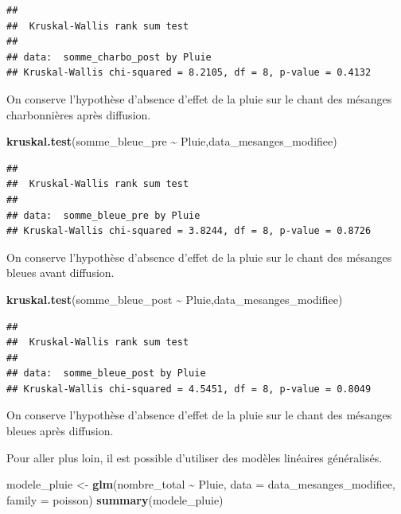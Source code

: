 \documentclass[
  french,
]{article}
\newenvironment{Shaded}{\begin{snugshade}}{\end{snugshade}}
\newcommand{\AttributeTok}[1]{\textcolor[rgb]{0.13,0.29,0.53}{#1}}
\newcommand{\FunctionTok}[1]{\textcolor[rgb]{0.13,0.29,0.53}{\textbf{#1}}}
\newcommand{\NormalTok}[1]{#1}
\newcommand{\OtherTok}[1]{\textcolor[rgb]{0.56,0.35,0.01}{#1}}
\newcommand{\SpecialCharTok}[1]{\textcolor[rgb]{0.81,0.36,0.00}{\textbf{#1}}}
\begin{document}
\begin{verbatim}
## 
##  Kruskal-Wallis rank sum test
## 
## data:  somme_charbo_post by Pluie
## Kruskal-Wallis chi-squared = 8.2105, df = 8, p-value = 0.4132
\end{verbatim}

On conserve l'hypothèse d'absence d'effet de la pluie sur le chant des
mésanges charbonnières après diffusion.

\begin{Shaded}
\begin{Highlighting}[]
\FunctionTok{kruskal.test}\NormalTok{(somme\_bleue\_pre }\SpecialCharTok{\textasciitilde{}}\NormalTok{ Pluie,data\_mesanges\_modifiee)}
\end{Highlighting}
\end{Shaded}

\begin{verbatim}
## 
##  Kruskal-Wallis rank sum test
## 
## data:  somme_bleue_pre by Pluie
## Kruskal-Wallis chi-squared = 3.8244, df = 8, p-value = 0.8726
\end{verbatim}

On conserve l'hypothèse d'absence d'effet de la pluie sur le chant des
mésanges bleues avant diffusion.

\begin{Shaded}
\begin{Highlighting}[]
\FunctionTok{kruskal.test}\NormalTok{(somme\_bleue\_post }\SpecialCharTok{\textasciitilde{}}\NormalTok{ Pluie,data\_mesanges\_modifiee)}
\end{Highlighting}
\end{Shaded}

\begin{verbatim}
## 
##  Kruskal-Wallis rank sum test
## 
## data:  somme_bleue_post by Pluie
## Kruskal-Wallis chi-squared = 4.5451, df = 8, p-value = 0.8049
\end{verbatim}

On conserve l'hypothèse d'absence d'effet de la pluie sur le chant des
mésanges bleues après diffusion.

Pour aller plus loin, il est possible d'utiliser des modèles linéaires
généralisés.

\begin{Shaded}
\begin{Highlighting}[]
\NormalTok{modele\_pluie }\OtherTok{\textless{}{-}} \FunctionTok{glm}\NormalTok{(nombre\_total }\SpecialCharTok{\textasciitilde{}}\NormalTok{ Pluie, }\AttributeTok{data =}\NormalTok{ data\_mesanges\_modifiee, }\AttributeTok{family =}\NormalTok{ poisson)}
\FunctionTok{summary}\NormalTok{(modele\_pluie)}
\end{Highlighting}
\end{Shaded}
\end{document}
